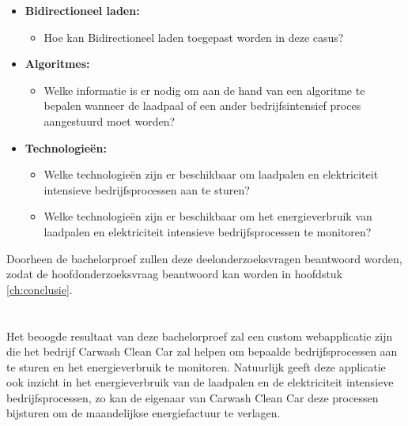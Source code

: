 \begin{itemize}
  \item \textbf{Bidirectioneel laden:}
  \begin{itemize}
    \item Hoe kan Bidirectioneel laden toegepast worden in deze casus?
  \end{itemize}
  \item \textbf{Algoritmes:}
  \begin{itemize}
    \item Welke informatie is er nodig om aan de hand van een algoritme te bepalen wanneer de laadpaal of een ander bedrijfsintensief proces aangestuurd moet worden?
  \end{itemize}
  \item \textbf{Technologieën:}
  \begin{itemize}
    \item Welke technologieën zijn er beschikbaar om laadpalen en elektriciteit intensieve bedrijfsprocessen aan te sturen?
    \item Welke technologieën zijn er beschikbaar om het energieverbruik van laadpalen en elektriciteit intensieve bedrijfsprocessen te monitoren?
  \end{itemize}
\end{itemize}

Doorheen de bachelorproef zullen deze deelonderzoeksvragen beantwoord worden, zodat de hoofdonderzoeksvraag beantwoord kan worden in hoofdstuk \ref{ch:conclusie}.

\section{}%
\label{sec:onderzoeksdoelstelling}

Het beoogde resultaat van deze bachelorproef zal een custom webapplicatie zijn die het bedrijf Carwash Clean Car zal helpen om bepaalde bedrijfsprocessen aan te sturen en het energieverbruik te monitoren. Natuurlijk geeft deze applicatie ook inzicht in het energieverbruik van de laadpalen en de elektriciteit intensieve bedrijfsprocessen, zo kan de eigenaar van Carwash Clean Car deze processen bijsturen om de maandelijkse energiefactuur te verlagen.

\section{}%
\label{sec:opzet-bachelorproef}

